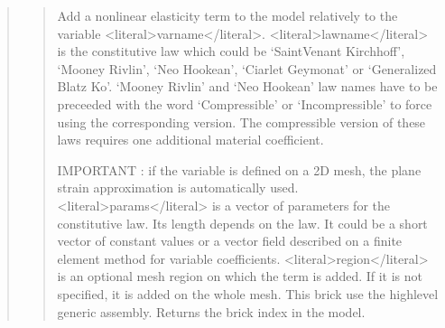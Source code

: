 \documentclass[a4paper,11pt,english]{sphinxmanual}
\begin{document}
\begin{quote}
\sphinxAtStartPar
{}
\begin{quote}

\sphinxAtStartPar
Add a nonlinear elasticity term to the model relatively to the
variable \textless{}literal\textgreater{}varname\textless{}/literal\textgreater{}. \textless{}literal\textgreater{}lawname\textless{}/literal\textgreater{} is the constitutive law which
could be ‘SaintVenant Kirchhoff’, ‘Mooney Rivlin’, ‘Neo Hookean’,
‘Ciarlet Geymonat’ or ‘Generalized Blatz Ko’.
‘Mooney Rivlin’ and ‘Neo Hookean’ law names have to be preceeded with
the word ‘Compressible’ or ‘Incompressible’ to force using the
corresponding version.
The compressible version of these laws requires one additional material
coefficient.

\sphinxAtStartPar
IMPORTANT : if the variable is defined on a 2D mesh, the plane strain
approximation is automatically used.
\textless{}literal\textgreater{}params\textless{}/literal\textgreater{} is a vector of parameters for the constitutive law. Its length
depends on the law. It could be a short vector of constant values or a
vector field described on a finite element method for variable
coefficients. \textless{}literal\textgreater{}region\textless{}/literal\textgreater{} is an optional mesh region on which the term
is added. If it is not specified, it is added on the whole mesh.
This brick use the high\sphinxhyphen{}level generic assembly.
Returns the brick index in the model.
\end{quote}

\sphinxAtStartPar
{}
\begin{quote}


\end{quote}
\end{quote}
\end{document}
